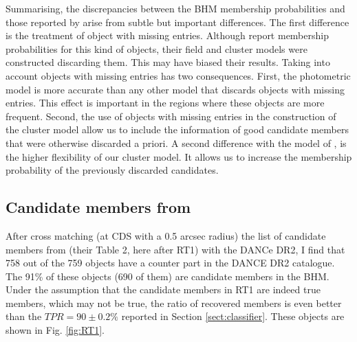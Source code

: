 Summarising, the discrepancies between the BHM membership probabilities and those reported by \citet{Bouy2015} arise from subtle but important differences. The first difference is the treatment of object with missing entries. Although  \citet{Bouy2015} report membership probabilities for this kind of objects, their field and cluster models were constructed discarding them. This may have biased their results. Taking into account objects with missing entries has two consequences. First, the photometric model is more accurate than any other model that discards objects with missing entries. This effect is important in the regions where these objects are more frequent. Second, the use of objects with missing entries in the construction of the cluster model allow us to include the information of good candidate members that were otherwise discarded a priori. A second difference with the model of \citet{Bouy2015}, is the higher flexibility of our cluster model. It allows us to increase the membership probability of the previously discarded candidates. 

\subsection{Candidate members from \citet{Rebull2016}}
\label{sect:comparisonRebull}

After cross matching (at CDS with a 0.5 arcsec radius) the list of candidate members from \citet{Rebull2016} (their Table 2, here after RT1) with the DANCe DR2, I find that 758 out of the 759 objects have a counter part in the DANCE DR2 catalogue. The 91\% of these objects (690 of them) are candidate members in the BHM. Under the assumption that the candidate members in RT1 are indeed true members, which may not be true, the ratio of recovered members is even better than the $TPR=90\pm0.2\%$ reported in Section \ref{sect:classifier}. These objects are shown in Fig. \ref{fig:RT1}.

